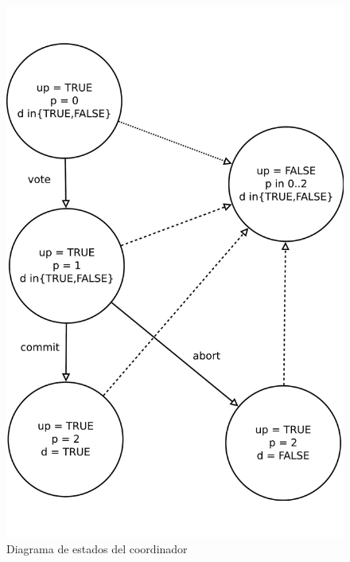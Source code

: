 \documentclass[pdftex,a4paper,12pt]{book}
\begin{document}
\begin{figure}[htp]
  \centering
    \includegraphics[scale=0.35]{Imagenes/2pcCoor.pdf}
  \caption{Diagrama de estados del coordinador}
  \label{2pcc}
\end{figure}
\end{document}

